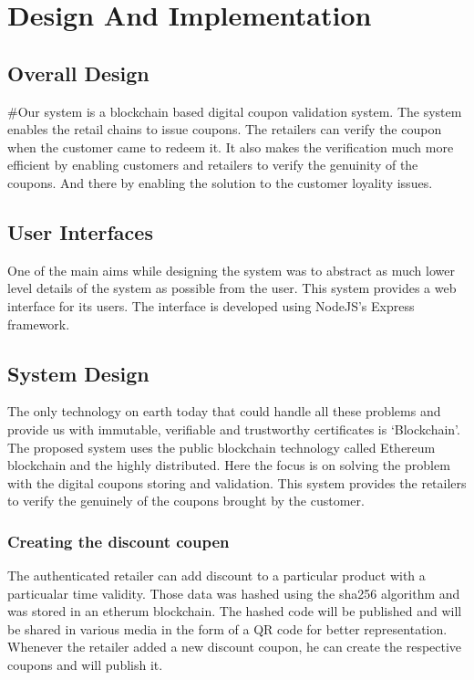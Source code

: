 \chapter{Design And Implementation}

\section{Overall Design}
\par
#Our system is a blockchain based digital coupon validation system. The system
enables the retail chains to issue coupons. The retailers can verify the coupon
when the customer came to redeem it. It also makes the verification much more
efficient by enabling customers and retailers to verify the genuinity of the coupons. And there by enabling the solution to the customer loyality issues.

\section{User Interfaces}
One of the main aims while designing the
system was to abstract as much lower level details of the system as possible
from the user. This system provides a web interface for its users. The interface is developed using NodeJS's Express framework.

\section{System Design}
\par
The only technology on earth today that could handle all these problems and provide us with immutable, verifiable and trustworthy certificates is ‘Blockchain’. The proposed system uses the public blockchain technology called Ethereum blockchain and the highly distributed. Here the focus is on solving the problem with the digital coupons storing and validation. This system provides the retailers to verify the genuinely of the coupons brought by the customer.
\subsection{Creating the discount coupen}
The authenticated retailer can add discount to a particular product with a particualar time validity. Those data was hashed using the sha256 algorithm and was stored in an etherum blockchain.
The hashed code will be published and will be shared in various media in the form of a QR code for better representation. Whenever the retailer added a new discount coupon, he can create the respective coupons and will publish it. 
